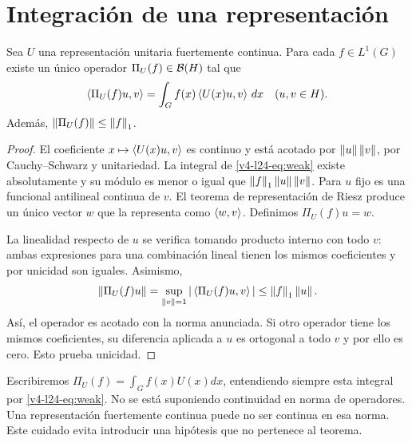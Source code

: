 \section{Integración de una representación}
\begin{proposicion}\label{v4-l24-p:integral}
Sea $U$ una representación unitaria fuertemente continua. Para cada $f\in L^1(G)$ existe un único operador $\Pi_U(f)\in\mathcal B(H)$ tal que
\begin{equation}\label{v4-l24-eq:weak}
\left\langle\Pi_U(f)u,v\right\rangle=\int_Gf(x)\left\langle U(x)u,v\right\rangle\,dx
\quad(u,v\in H).
\end{equation}
Además, $\left\lVert\Pi_U(f)\right\rVert\leq\left\lVert f\right\rVert_1$.
\end{proposicion}
\begin{proof}
El coeficiente $x\mapsto\left\langle U(x)u,v\right\rangle$ es continuo y está acotado por $\left\lVert u\right\rVert\left\lVert v\right\rVert$, por Cauchy--Schwarz y unitariedad. La integral de \eqref{v4-l24-eq:weak} existe absolutamente y su módulo es menor o igual que $\left\lVert f\right\rVert_1\left\lVert u\right\rVert\left\lVert v\right\rVert$. Para $u$ fijo es una funcional antilineal continua de $v$. El teorema de representación de Riesz produce un único vector $w$ que la representa como $\left\langle w,v\right\rangle$. Definimos $\Pi_U(f)u=w$.

La linealidad respecto de $u$ se verifica tomando producto interno con todo $v$: ambas expresiones para una combinación lineal tienen los mismos coeficientes y por unicidad son iguales. Asimismo,
\[
\left\lVert\Pi_U(f)u\right\rVert=\sup_{\left\lVert v\right\rVert=1}|\left\langle\Pi_U(f)u,v\right\rangle|
\leq\left\lVert f\right\rVert_1\left\lVert u\right\rVert.
\]
Así, el operador es acotado con la norma anunciada. Si otro operador tiene los mismos coeficientes, su diferencia aplicada a $u$ es ortogonal a todo $v$ y por ello es cero. Esto prueba unicidad.
\end{proof}

Escribiremos $\Pi_U(f)=\int_Gf(x)U(x)dx$, entendiendo siempre esta integral por \eqref{v4-l24-eq:weak}. No se está suponiendo continuidad en norma de operadores. Una representación fuertemente continua puede no ser continua en esa norma. Este cuidado evita introducir una hipótesis que no pertenece al teorema.

